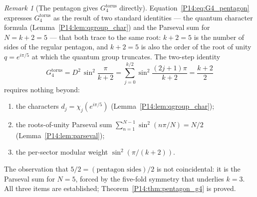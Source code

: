\documentclass[11pt,a4paper]{article}
\theoremstyle{definition}
\theoremstyle{remark}
\newtheorem{remark}[theorem]{Remark}
\begin{document}
\begin{remark}[The pentagon gives $G_4^{\mathrm{torus}}$ directly]
\label{P14:rem:pentagon_direct}
Equation~\eqref{P14:eq:G4_pentagon} expresses $G_4^{\mathrm{torus}}$
as the result of two standard identities — the quantum character formula
(Lemma~\ref{P14:lem:qgroup_char}) and the Parseval sum for $N=k+2=5$ —
that both trace to the same root: $k+2=5$ is the number of sides of
the regular pentagon, and $k+2=5$ is also the order of the root of
unity $q=e^{i\pi/5}$ at which the quantum group truncates.
The two-step identity
\begin{equation}
  G_4^{\mathrm{torus}}
  = D^2\,\sin^2\!\frac{\pi}{k+2}
  = \sum_{j=0}^{k/2}\sin^2\!\frac{(2j+1)\pi}{k+2}
  = \frac{k+2}{2}
  \label{P14:eq:two_step}
\end{equation}
requires nothing beyond:
\begin{enumerate}[noitemsep,label=(\roman*)]
  \item the characters $d_j = \chi_j(e^{i\pi/5})$ (Lemma~\ref{P14:lem:qgroup_char});
  \item the roots-of-unity Parseval sum $\sum_{n=1}^{N-1}\sin^2(n\pi/N)=N/2$
    (Lemma~\ref{P14:lem:parseval});
  \item the per-sector modular weight $\sin^2(\pi/(k+2))$.
\end{enumerate}
The observation that $5/2 = (\text{pentagon sides})/2$
is not coincidental: it is the Parseval sum for $N=5$, forced by
the five-fold symmetry that underlies $k=3$.
All three items are established; Theorem~\ref{P14:thm:pentagon_g4}
is proved.
\end{remark}
\end{document}
